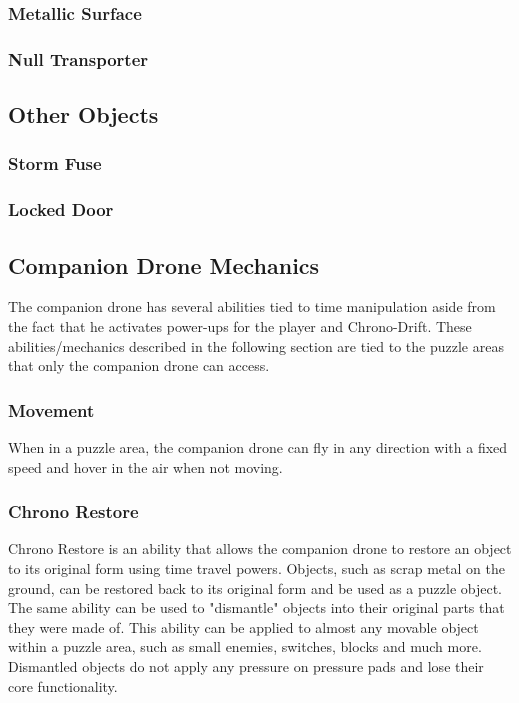 \documentclass[12pt]{article}
\begin{document}
\subsubsection{Metallic Surface}

\subsubsection{Null Transporter}

\subsection{Other Objects}

\subsubsection{Storm Fuse}

\subsubsection{Locked Door}

\subsection{Companion Drone Mechanics}

The companion drone has several abilities tied to time manipulation aside from the fact that he activates power-ups for the player and Chrono-Drift. These abilities/mechanics described in the following section are tied to the puzzle areas that only the companion drone can access.

\subsubsection{Movement}

When in a puzzle area, the companion drone can fly in any direction with a fixed speed and hover in the air when not moving. 

\subsubsection{Chrono Restore}

Chrono Restore is an ability that allows the companion drone to restore an object to its original form using time travel powers. Objects, such as scrap metal on the ground, can be restored back to its original form and be used as a puzzle object. The same ability can be used to "dismantle" objects into their original parts that they were made of. This ability can be applied to almost any movable object within a puzzle area, such as small enemies, switches, blocks and much more. Dismantled objects do not apply any pressure on pressure pads and lose their core functionality. 
\end{document}
